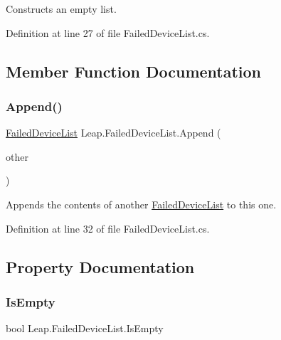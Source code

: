Constructs an empty list. 



Definition at line 27 of file Failed\+Device\+List.\+cs.



\subsection{Member Function Documentation}
\mbox{\label{class_leap_1_1_failed_device_list_a718993fa65c5ce4e646cd555f6753f5c}} 
\subsubsection{\texorpdfstring{Append()}{Append()}}
{\footnotesize\ttfamily \mbox{\hyperlink{class_leap_1_1_failed_device_list}{Failed\+Device\+List}} Leap.\+Failed\+Device\+List.\+Append (\begin{DoxyParamCaption}\item[{\mbox{\hyperlink{class_leap_1_1_failed_device_list}{Failed\+Device\+List}}}]{other }\end{DoxyParamCaption})}



Appends the contents of another \mbox{\hyperlink{class_leap_1_1_failed_device_list}{Failed\+Device\+List}} to this one. 



Definition at line 32 of file Failed\+Device\+List.\+cs.



\subsection{Property Documentation}
\mbox{\label{class_leap_1_1_failed_device_list_a616c339feb565a9745fedbfc2c2e6361}} 
\subsubsection{\texorpdfstring{IsEmpty}{IsEmpty}}
{\footnotesize\ttfamily bool Leap.\+Failed\+Device\+List.\+Is\+Empty\hspace{0.3cm}{\ttfamily [get]}}



